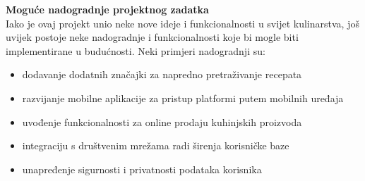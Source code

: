 		\noindent\textbf{Moguće nadogradnje projektnog zadatka}\\

		\noindent Iako je ovaj projekt unio neke nove ideje i funkcionalnosti u svijet kulinarstva, još uvijek postoje neke nadogradnje i funkcionalnosti koje bi mogle biti implementirane u budućnosti. Neki primjeri nadogradnji su:
		\begin{itemize}
			\item dodavanje dodatnih značajki za napredno pretraživanje recepata
			\item razvijanje mobilne aplikacije za pristup platformi putem mobilnih uređaja
			\item uvođenje funkcionalnosti za online prodaju kuhinjskih proizvoda
			\item integraciju s društvenim mrežama radi širenja korisničke baze
			\item unapređenje sigurnosti i privatnosti podataka korisnika
		\end{itemize}
		\eject
